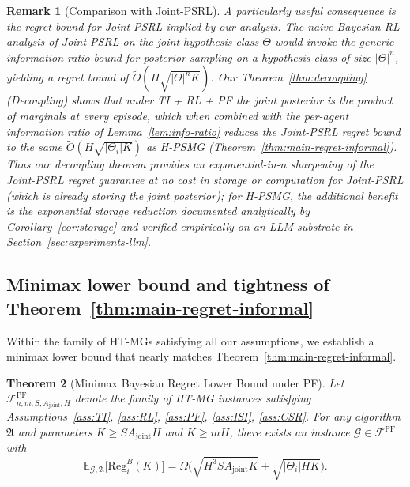 \documentclass{article}
\newtheorem{theorem}{Theorem}[section]
\newtheorem{remark}[theorem]{Remark}
\begin{document}
\begin{remark}[Comparison with Joint-PSRL]
A particularly useful consequence is the regret bound for Joint-PSRL implied by our analysis. The naive Bayesian-RL analysis of Joint-PSRL on the joint hypothesis class $\Theta$ would invoke the generic information-ratio bound for posterior sampling on a hypothesis class of size $|\Theta|^n$, yielding a regret bound of $\tilde O(H\sqrt{|\Theta|^n K})$. Our Theorem~\ref{thm:decoupling} (Decoupling) shows that under TI + RL + PF the joint posterior is the product of marginals at every episode, which when combined with the per-agent information ratio of Lemma~\ref{lem:info-ratio} reduces the Joint-PSRL regret bound to the same $\tilde O(H\sqrt{|\Theta_i| K})$ as H-PSMG (Theorem~\ref{thm:main-regret-informal}). Thus our decoupling theorem provides an exponential-in-$n$ sharpening of the Joint-PSRL regret guarantee at no cost in storage or computation for Joint-PSRL (which is already storing the joint posterior); for H-PSMG, the additional benefit is the exponential storage reduction documented analytically by Corollary~\ref{cor:storage} and verified empirically on an LLM substrate in Section~\ref{sec:experiments-llm}.
\end{remark}

\subsection{Minimax lower bound and tightness of Theorem~\ref{thm:main-regret-informal}}
\label{sec:lower-bound-matching}

Within the family of HT-MGs satisfying all our assumptions, we establish a minimax lower bound that nearly matches Theorem~\ref{thm:main-regret-informal}.

\begin{theorem}[Minimax Bayesian Regret Lower Bound under PF]
\label{thm:lower-matching}
Let $\mathcal{F}^{\mathrm{PF}}_{n, m, S, A_{\mathrm{joint}}, H}$ denote the family of HT-MG instances satisfying Assumptions~\ref{ass:TI}, \ref{ass:RL}, \ref{ass:PF}, \ref{ass:ISI}, \ref{ass:CSR}. For any algorithm $\mathfrak{A}$ and parameters $K \geq SA_{\mathrm{joint}}H$ and $K \geq mH$, there exists an instance $\mathcal{G} \in \mathcal{F}^{\mathrm{PF}}$ with
\begin{equation}
\mathbb{E}_{\mathcal{G}, \mathfrak{A}}\big[\mathrm{Reg}_i^B(K)\big] = \Omega\Big(\sqrt{H^3 S A_{\mathrm{joint}} K} + \sqrt{|\Theta_i| H K}\Big).
\end{equation}
\end{theorem}
\end{document}
